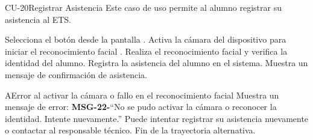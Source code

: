 
\begin{UseCase}{CU-20}{Registrar Asistencia}{
		Este caso de uso permite al alumno registrar su asistencia al ETS.
	}
\end{UseCase}
\begin{UCtrayectoria}
	\UCpaso[\UCactor] Selecciona el botón  desde la pantalla .
	\UCpaso Activa la cámara del dispositivo para iniciar el reconocimiento facial . 
	\UCpaso Realiza el reconocimiento facial y verifica la identidad del alumno.
	\UCpaso Registra la asistencia del alumno en el sistema.
	\UCpaso Muestra un mensaje de confirmación de asistencia.
\end{UCtrayectoria}
\begin{UCtrayectoriaA}{A}{Error al activar la cámara o fallo en el reconocimiento facial}
	\UCpaso Muestra un mensaje de error: {\bf MSG-22-}{``No se pudo activar la cámara o reconocer la identidad. Intente nuevamente.''}
	\UCpaso[\UCactor] Puede intentar registrar su asistencia nuevamente o contactar al responsable técnico.
	\UCpaso Fin de la trayectoria alternativa.
\end{UCtrayectoriaA}


